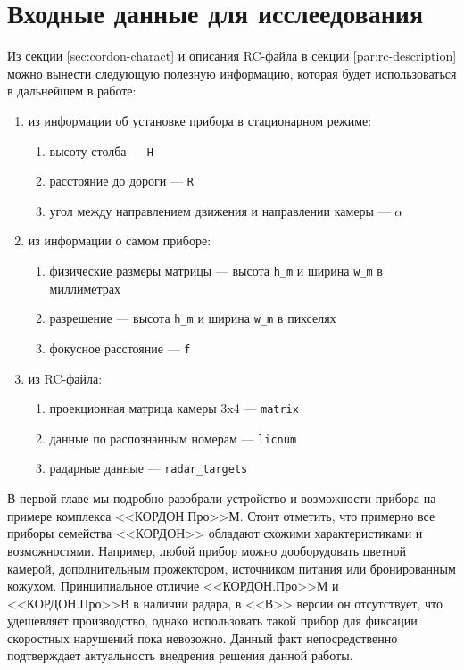 \documentclass[specification,annotation,times]{itmo-student-thesis}
\begin{document}
	\section{Входные данные для исслеедования}
	Из секции \ref{sec:cordon-charact} и описания RC-файла в секции \ref{par:rc-description} можно вынести следующую полезную информацию, которая будет использоваться в дальнейшем в работе: 
	\begin{enumerate}
		\item из информации об установке прибора в стационарном режиме:
		\begin{enumerate}
			\item высоту столба --- \texttt{H}
			\item расстояние до дороги --- \texttt{R}
			\item угол между направлением движения и направлении камеры --- $ \alpha  $
		\end{enumerate}
		\item из информации о самом приборе:
		\begin{enumerate}
			\item физические размеры матрицы --- высота \texttt{h\_m} и ширина \texttt{w\_m} в миллиметрах
			\item разрешение --- высота \texttt{h\_m} и ширина \texttt{w\_m} в пикселях
			\item фокусное расстояние --- \texttt{f}
		\end{enumerate}
		\item из RC-файла:
		\begin{enumerate}
			\item проекционная матрица камеры 3x4 --- \texttt{matrix}
			\item данные по распознанным номерам --- \texttt{licnum}
			\item радарные данные --- \texttt{radar\_targets}
		\end{enumerate}
	\end{enumerate}
	
	\chapterconclusion
	
	В первой главе мы подробно разобрали устройство и возможности прибора на примере комплекса  <<КОРДОН.Про>>М. Стоит отметить, что примерно все приборы семейства <<КОРДОН>> обладают схожими характеристиками и возможностями. Например, любой прибор можно дооборудовать цветной камерой, дополнительным прожектором, источником питания или бронированным кожухом. Принципиальное отличие <<КОРДОН.Про>>М и <<КОРДОН.Про>>В в наличии радара, в <<В>>  версии он отсутствует, что удешевляет производство, однако использовать такой прибор для фиксации скоростных нарушений пока невозожно. Данный факт непосредственно подтверждает актуальность внедрения решения данной работы.
	
\end{document}
